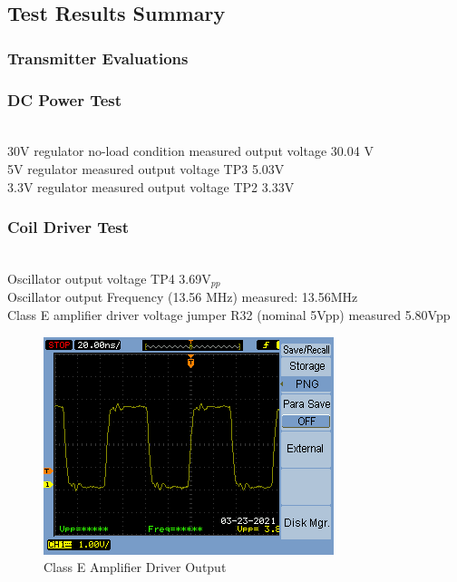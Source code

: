 \documentclass[12pt]{article}
\begin{document}
\subsection{Test Results Summary}

\subsubsection{Transmitter Evaluations} \hfill
\subsubsection*{DC Power Test} \hfill \\
\noindent
30V regulator no-load condition measured output voltage 30.04 V\\
5V regulator measured output voltage TP3 5.03V\\
3.3V regulator measured output voltage TP2 3.33V\\
 
\subsubsection*{Coil Driver Test} \hfill \\
Oscillator output voltage TP4 3.69V$_{pp}$\\
 
\noindent
Oscillator output Frequency (13.56 MHz) measured: 13.56MHz\\
Class E amplifier driver voltage jumper R32 (nominal 5Vpp) measured 5.80Vpp
\hfill
\begin{figure}[h!]
\centering
\includegraphics[width=0.8\linewidth]{osc_out}
\caption{Class E Amplifier Driver Output}
\end{figure}
\hfill \\
\pagebreak
\end{document}
